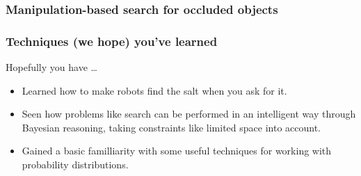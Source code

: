 \begin{frame}
  \frametitle{Manipulation-based search for occluded objects}
\end{frame}

\begin{frame}
  \frametitle{Techniques (we hope) you've learned}
  Hopefully you have \ldots
  \begin{itemize}
    \item Learned how to make robots find the salt when you ask for it.
    \item Seen how problems like search can be performed in an
          intelligent way through Bayesian reasoning,
          taking constraints like limited space into account.
    \item Gained a basic familliarity with some useful techniques for working with probability distributions.
  \end{itemize}
\end{frame}

